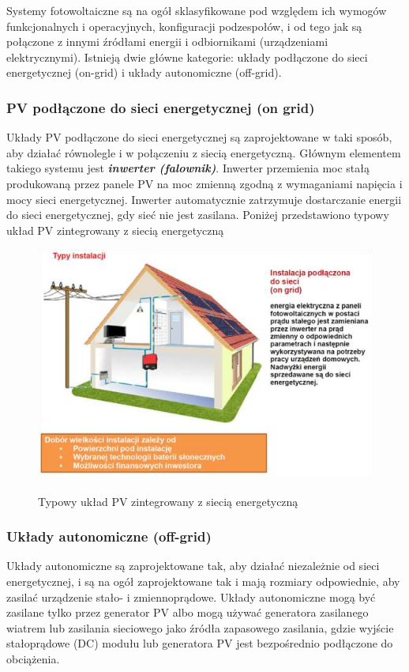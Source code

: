 \documentclass[12pt,a4paper]{article}
\begin{document}
Systemy fotowoltaiczne są na ogół sklasyfikowane pod względem ich 
wymogów funkcjonalnych i operacyjnych, konfiguracji podzespołów, i od 
tego jak są połączone z innymi źródłami energii i odbiornikami 
(urządzeniami elektrycznymi). Istnieją dwie główne kategorie: układy 
podłączone do sieci energetycznej (on-grid) i układy autonomiczne (off-grid). 

\subsubsection{PV podłączone do sieci energetycznej (on grid) }

Układy PV podłączone do sieci energetycznej są zaprojektowane w taki 
sposób, aby działać równolegle i w połączeniu z siecią energetyczną. 
Głównym elementem takiego systemu jest \textit{\textbf{inwerter (falownik)}}. Inwerter 
przemienia moc stałą  produkowaną przez panele PV na moc zmienną  zgodną z 
wymaganiami napięcia i mocy sieci energetycznej. Inwerter automatycznie 
zatrzymuje dostarczanie energii do sieci energetycznej, gdy sieć nie 
jest zasilana. Poniżej przedstawiono typowy układ PV zintegrowany z 
siecią energetyczną 

\begin{figure}[h]
\centering
	\caption{Typowy układ PV zintegrowany z siecią energetyczną }
 	\includegraphics[natwidth=14.41cm,natheight=9.89cm]{media/image3.png}
 	\label{fig:on-grid}
\end{figure}

\subsubsection{Układy autonomiczne (off-grid)} 
Układy autonomiczne  są zaprojektowane tak, aby działać niezależnie od 
sieci energetycznej, i są na ogół zaprojektowane tak i mają rozmiary 
odpowiednie, aby zasilać urządzenie stało- i zmiennoprądowe. Układy autonomiczne mogą być zasilane tylko przez 
generator PV albo mogą używać generatora zasilanego wiatrem lub 
zasilania sieciowego jako źródła zapasowego zasilania, gdzie wyjście 
stałoprądowe (DC) modułu lub generatora PV jest bezpośrednio podłączone 
do obciążenia. 
\end{document}
